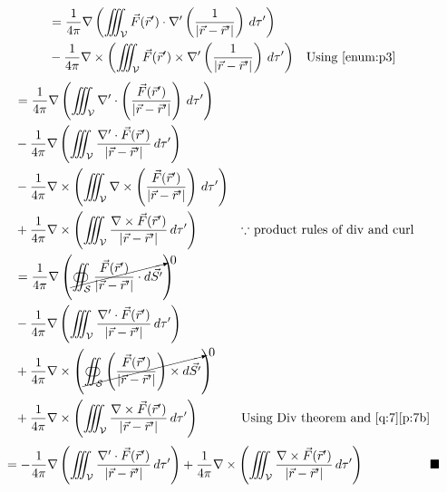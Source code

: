 \documentclass[../main.tex]{subfiles}
\begin{document}
\begin{questions}
\begin{parts}
\begin{solution}
\begin{align}
			&= \frac{1}{4\pi}\nabla\left(\iiint_\mathcal{V}\vec{F}(\vec{r}')\cdot\nabla'\left(\frac{1}{|\vec{r}-\vec{r}'|}\right)\,d\tau'\right)\\
			&- \frac{1}{4\pi}\nabla\times\left(\iiint_\mathcal{V}\vec{F}(\vec{r}')\times\nabla'\left(\frac{1}{|\vec{r}-\vec{r}'|}\right)\,d\tau'\right) && \text{Using \ref{enum:p3}}
		\end{align}
		\begin{align}
			&= \frac{1}{4\pi}\nabla\left(\iiint_\mathcal{V}\nabla'\cdot\left(\frac{\vec{F}(\vec{r}')}{|\vec{r}-\vec{r}'|}\right)\,d\tau'\right)\\
			&- \frac{1}{4\pi}\nabla\left(\iiint_\mathcal{V}\frac{\nabla'\cdot\vec{F}(\vec{r}')}{|\vec{r}-\vec{r}'|}\,d\tau'\right)\\
			&- \frac{1}{4\pi}\nabla\times\left(\iiint_\mathcal{V}\nabla\times\left(\frac{\vec{F}(\vec{r}')}{|\vec{r}-\vec{r}'|}\right)\,d\tau'\right)\\
			&+ \frac{1}{4\pi}\nabla\times\left(\iiint_\mathcal{V}\frac{\nabla\times\vec{F}(\vec{r}')}{|\vec{r}-\vec{r}'|}\,d\tau'\right) && \text{$\because$ product rules of div and curl}\\
			&= \frac{1}{4\pi}\nabla\left(\cancelto{0}{\oiint_\mathcal{S}\frac{\vec{F}(\vec{r}')}{|\vec{r}-\vec{r}'|}\cdot d\vec{S'}} \right)\\
			&- \frac{1}{4\pi}\nabla\left(\iiint_\mathcal{V}\frac{\nabla'\cdot\vec{F}(\vec{r}')}{|\vec{r}-\vec{r}'|}\,d\tau'\right)\\
			&+ \frac{1}{4\pi}\nabla\times\left(\cancelto{0}{\oiint_\mathcal{S}\left(\frac{\vec{F}(\vec{r}')}{|\vec{r}-\vec{r}'|}\right)\times d\vec{S'}}\right)\\
			&+ \frac{1}{4\pi}\nabla\times\left(\iiint_\mathcal{V}\frac{\nabla\times\vec{F}(\vec{r}')}{|\vec{r}-\vec{r}'|}\,d\tau'\right) && \text{Using Div theorem and \ref{q:7}\ref{p:7b}}
		\end{align}
		\begin{align}
			&= - \frac{1}{4\pi}\nabla\left(\iiint_\mathcal{V}\frac{\nabla'\cdot\vec{F}(\vec{r}')}{|\vec{r}-\vec{r}'|}\,d\tau'\right) + \frac{1}{4\pi}\nabla\times\left(\iiint_\mathcal{V}\frac{\nabla\times\vec{F}(\vec{r}')}{|\vec{r}-\vec{r}'|}\,d\tau'\right)\hskip 0.15\textwidth\blacksquare
		\end{align}
	\end{solution}
\end{parts}

\question 
\begin{parts}

\end{parts}
\end{questions}
\end{document}
